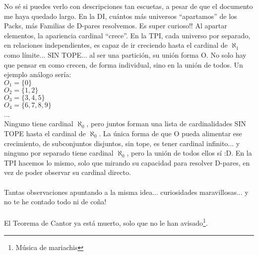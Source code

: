 	\noindent
	No sé si puedes verlo con descripciones tan escuetas, a pesar de que el documento me haya quedado largo. En la DI, cuántos más universos ``apartamos'' de los Packs, más Familias de D-pares resolvemos. Es super curioso!! Al apartar elementos, la apariencia cardinal ``crece''. En la TPI, cada universo por separado, en relaciones independientes, es capaz de ir creciendo hasta el cardinal de $\aleph_{1}$ como límite... SIN TOPE... al ser una partición, su unión forma O. No solo hay que pensar en como crecen, de forma individual, sino en la unión de todos. Un ejemplo análogo sería:\\
	$O_{1}=\{0\}$\\
	$O_{2}=\{1,2\}$\\
	$O_{3}=\{3,4,5\}$\\
	$O_{4}=\{6,7,8,9\}$\\
	...\\
	Ninguno tiene cardinal $\aleph_{0}$, pero juntos forman una lista de cardinalidades SIN TOPE hasta el cardinal de $\aleph_{0}$. La única forma de que O pueda alimentar ese crecimiento, de subconjuntos disjuntos, sin tope, es tener cardinal infinito... y ninguno por separado tiene cardinal $\aleph_{0}$, pero la unión de todos ellos sí :D. En la TPI hacemos lo mismo, solo que mirando su capacidad para resolver D-pares, en vez de poder observar su cardinal directo.
	\\\\
	
	\noindent
	Tantas observaciones apuntando a la misma idea... curiosidades maravillosas... y no te he contado todo ni de coña!
	\\\\
	
	
	\noindent
	El Teorema de Cantor ya está muerto, solo que no le han avisado\footnote{Música de mariachis}.
	
	